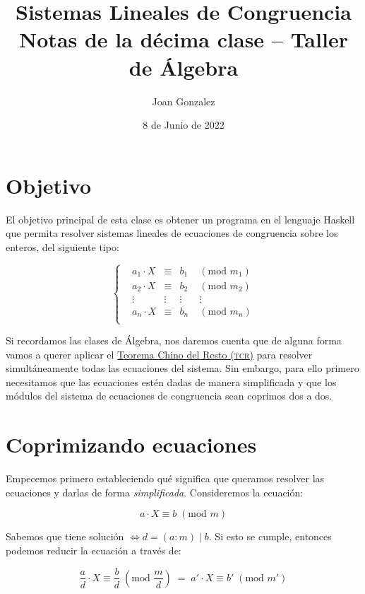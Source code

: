 \documentclass{article}
\title{
  Sistemas Lineales de Congruencia \\
  \large Notas de la décima clase \textbf{--} Taller de Álgebra \\}
\author{Joan Gonzalez}
\date{8 de Junio de 2022}
\newcommand{\nln}{\par\vspace{3mm}}
\begin{document}
\maketitle
\newpage

\section{Objetivo}
El objetivo principal de esta clase es obtener un programa en el lenguaje Haskell que permita resolver sistemas lineales de ecuaciones de congruencia sobre los enteros, del siguiente tipo:

\begin{equation*}
\left\{\begin{matrix}
 &a_1 \cdot X &\equiv &b_1 \; &(\text{mod } m_1)  \\
 &a_2 \cdot X &\equiv &b_2 \; &(\text{mod } m_2)  \\
 &\vdots      &\vdots &\vdots &\vdots             \\
 &a_n \cdot X &\equiv &b_n \; &(\text{mod } m_n)  \\
\end{matrix}\right.
\end{equation*}
\nln

Si recordamos las clases de Álgebra, nos daremos cuenta que de alguna forma vamos a querer aplicar el \href{https://es.wikipedia.org/wiki/Teorema_chino_del_resto?oldformat=true}{Teorema Chino del Resto (\textsc{tcr})} para resolver simultáneamente todas las ecuaciones del sistema.
Sin embargo, para ello primero necesitamos que las ecuaciones estén dadas de manera simplificada y que los módulos del sistema de ecuaciones de congruencia sean coprimos dos a dos.

\section{Coprimizando ecuaciones}
Empecemos primero estableciendo qué significa que queramos resolver las ecuaciones y darlas de forma \textit{simplificada}. Consideremos la ecuación:

\begin{equation} \label{modularEquation}
    a \cdot X \equiv b \; (\text{mod } m)
\end{equation}

Sabemos que tiene solución $\iff d = (a:m) \mid b$. Si esto se cumple, entonces podemos reducir la ecuación a través de:

\begin{equation} \label{coprimes}
    \frac{a}{d} \cdot X \equiv \frac{b}{d} \; (\text{mod } \frac{m}{d}) \; = \; 
    a' \cdot X \equiv b' \; (\text{mod } m')
\end{equation}
\nln
\end{document}
